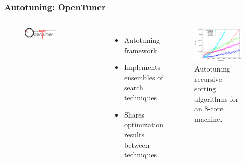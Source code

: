 \documentclass[10pt, compress]{beamer}
\begin{document}
\begin{frame}[fragile]
  \frametitle{Autotuning: OpenTuner}
    \begin{columns}
        \begin{figure}[H]
            \centering
            \includegraphics[width=0.55\textwidth]{opentuner-logo}
        \end{figure}%
        \begin{itemize}
            \item Autotuning framework
            \item Implements ensembles of search techniques
            \item Shares optimization results between techniques
        \end{itemize}
        \begin{figure}[H]
            \centering
            \includegraphics[width=1.05\textwidth]{sorting}
            \caption{Autotuning recursive sorting algorithms for an 8-core machine.}
        \end{figure}%
    \end{columns}
  \let\thefootnote\relax{}
\end{frame}
\end{document}

